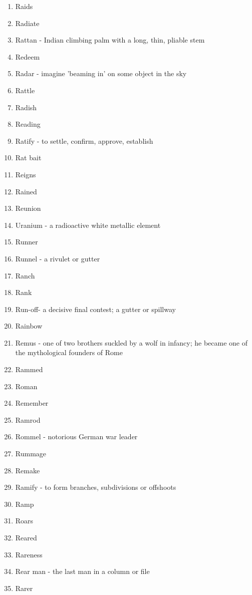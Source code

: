 \begin{enumerate}
        \item Raids
        \item Radiate
        \item Rattan - Indian climbing palm with a long, thin, pliable stem
        \item Redeem
        \item Radar - imagine 'beaming in' on some object in the sky
        \item Rattle
        \item Radish
        \item Reading
        \item Ratify - to settle, confirm, approve, establish
        \item Rat bait
        \item Reigns
        \item Rained
        \item Reunion
        \item Uranium - a radioactive white metallic element
        \item Runner
        \item Runnel - a rivulet or gutter
        \item Ranch
        \item Rank
        \item Run-off- a decisive final contest; a gutter or spillway
        \item Rainbow
        \item Remus - one of two brothers suckled by a wolf in infancy; he became one of the mythological founders of Rome
        \item Rammed
        \item Roman
        \item Remember
        \item Ramrod
        \item Rommel - notorious German war leader
        \item Rummage
        \item Remake
        \item Ramify - to form branches, subdivisions or offshoots
        \item Ramp
        \item Roars
        \item Reared
        \item Rareness
        \item Rear man - the last man in a column or file
        \item Rarer

\end{enumerate}

